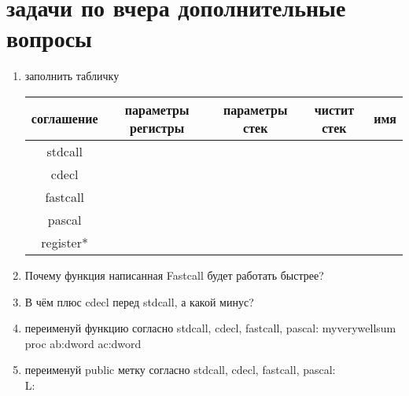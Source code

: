 \documentclass[a4paper,10pt]{article}
\begin{document}
\section*{задачи по вчера дополнительные вопросы}
\begin{enumerate}
    \item заполнить табличку \\
    \begin{tabular}{|c|c|c|c|c|}
        \hline
        соглашение & параметры регистры & параметры стек & чистит стек & имя \\
        \hline
        stdcall & & & & \\
        \hline
        cdecl & & & & \\
        \hline
        fastcall & & & & \\
        \hline
        pascal & & & & \\
        \hline
        register* & & & & \\
        \hline
    \end{tabular}
    \item Почему функция написанная Fastcall будет работать быстрее?
    \item В чём плюс cdecl перед stdcall, а какой минус?
    \item переименуй функцию согласно stdcall, cdecl, fastcall, pascal:
    myverywellsum proc ab:dword ac:dword\\
    \item переименуй public метку согласно stdcall, cdecl, fastcall, pascal: \\
    L: \\
\end{enumerate}
\end{document}
